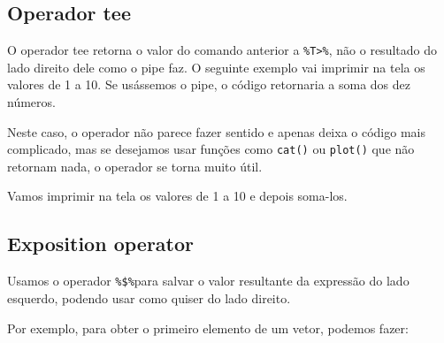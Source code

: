 \documentclass[
]{book}
\newenvironment{Shaded}{\begin{snugshade}}{\end{snugshade}}
\newcommand{\CommentTok}[1]{\textcolor[rgb]{0.56,0.35,0.01}{\textit{#1}}}
\newcommand{\DataTypeTok}[1]{\textcolor[rgb]{0.13,0.29,0.53}{#1}}
\newcommand{\DecValTok}[1]{\textcolor[rgb]{0.00,0.00,0.81}{#1}}
\newcommand{\KeywordTok}[1]{\textcolor[rgb]{0.13,0.29,0.53}{\textbf{#1}}}
\newcommand{\NormalTok}[1]{#1}
\newcommand{\OperatorTok}[1]{\textcolor[rgb]{0.81,0.36,0.00}{\textbf{#1}}}
\newcommand{\StringTok}[1]{\textcolor[rgb]{0.31,0.60,0.02}{#1}}
\begin{document}
\hypertarget{operador-tee}{%
\subsection{Operador tee}\label{operador-tee}}

O operador tee retorna o valor do comando anterior a \texttt{\%T\textgreater{}\%}, não o resultado do lado direito dele como o pipe faz. O seguinte exemplo vai imprimir na tela os valores de 1 a 10. Se usássemos o pipe, o código retornaria a soma dos dez números.

\begin{Shaded}
\end{Shaded}

Neste caso, o operador não parece fazer sentido e apenas deixa o código mais complicado, mas se desejamos usar funções como \texttt{cat()} ou \texttt{plot()} que não retornam nada, o operador se torna muito útil.

Vamos imprimir na tela os valores de 1 a 10 e depois soma-los.

\begin{Shaded}
\end{Shaded}

\hypertarget{exposition-operator}{%
\subsection{Exposition operator}\label{exposition-operator}}

Usamos o operador \texttt{\%\$\%}para salvar o valor resultante da expressão do lado esquerdo, podendo usar como quiser do lado direito.

Por exemplo, para obter o primeiro elemento de um vetor, podemos fazer:

\begin{Shaded}
\end{Shaded}
\end{document}
